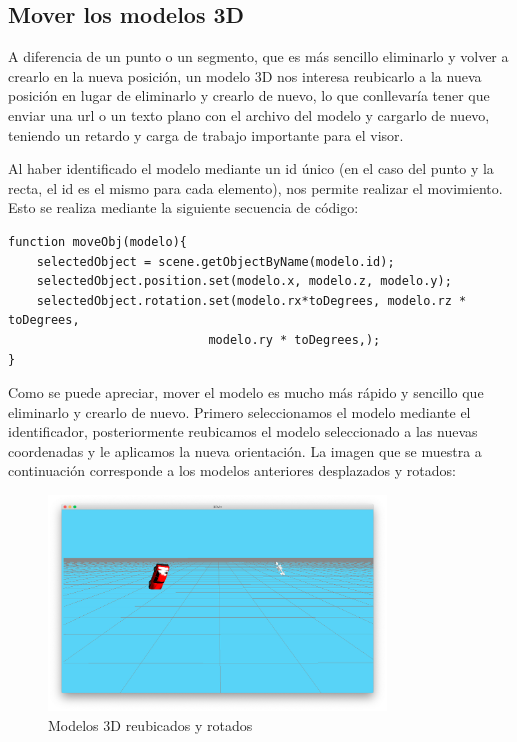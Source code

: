 \subsection{Mover los modelos 3D}
A diferencia de un punto o un segmento, que es más sencillo eliminarlo y volver a crearlo en la nueva posición, un modelo 3D nos interesa reubicarlo a la nueva posición en lugar de eliminarlo y crearlo de nuevo, lo que conllevaría tener que enviar una url o un texto plano con el archivo del modelo y cargarlo de nuevo, teniendo un retardo y carga de trabajo importante para el visor.

Al haber identificado el modelo mediante un id único (en el caso del punto y la recta, el id es el mismo para cada elemento), nos permite realizar el movimiento. Esto se realiza mediante la siguiente secuencia de código:
\begin{lstlisting}[frame=single]
function moveObj(modelo){
	selectedObject = scene.getObjectByName(modelo.id);
	selectedObject.position.set(modelo.x, modelo.z, modelo.y);
	selectedObject.rotation.set(modelo.rx*toDegrees, modelo.rz * toDegrees, 
							modelo.ry * toDegrees,);
}
\end{lstlisting}
Como se puede apreciar, mover el modelo es mucho más rápido y sencillo que eliminarlo y crearlo de nuevo. Primero seleccionamos el modelo mediante el identificador, posteriormente reubicamos el modelo seleccionado a las nuevas coordenadas y le aplicamos la nueva orientación. La imagen que se muestra a continuación corresponde a los modelos anteriores desplazados y rotados:
\begin{figure}[H]
  \begin{center}
    \includegraphics[width=0.8\textwidth]{figures/movermodelos.png}
		\caption{Modelos 3D reubicados y rotados}
		\label{fig.movermodelos}
		\end{center}
\end{figure}
